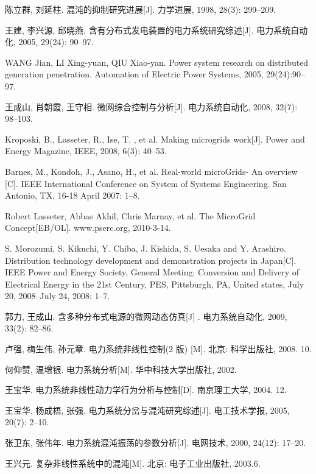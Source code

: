 \documentclass[withoutpreface,bwprint]{cumcmthesis} %
\begin{document}
\begin{thebibliography}{99}
   陈立群, 刘延柱. 混沌的抑制研究进展[J]. 力学进展, 1998, 28(3): 299--209.

   王建, 李兴源, 邱晓燕. 含有分布式发电装置的电力系统研究综述[J]. 电力系统自动化, 2005, 29(24): 90--97.

   WANG Jian, LI Xing-yuan, QIU Xiao-yan. Power system research on distributed generation penetration.
  Automation of Electric Power Systems, 2005, 29(24):90--97.

   王成山, 肖朝霞, 王守相. 微网综合控制与分析[J]. 电力系统自动化, 2008, 32(7): 98--103.

   Kroposki, B., Lasseter, R., Ise, T. , et al. Making microgrids work[J]. Power and Energy Magazine, IEEE,
  2008, 6(3): 40--53.

   Barnes, M., Kondoh, J., Asano, H., et al. Real-world microGrids- An overview [C]. IEEE International
  Conference on System of Systems Engineering. San Antonio, TX, 16-18 April 2007: 1--8.

   Robert Lasseter, Abbas Akhil, Chris Marnay, et al. The MicroGrid Concept[EB/OL]. www.pserc.org, 2010-3-14.

   S. Morozumi, S. Kikuchi, Y. Chiba, J. Kishida, S. Uesaka and Y. Arashiro. Distribution technology
  development and demonstration projects in Japan[C]. IEEE Power and Energy Society, General Meeting:
  Conversion and Delivery of Electrical Energy in the 21st Century, PES, Pittsburgh, PA, United states, July 20, 2008--July 24, 2008: 1--7.

   郭力, 王成山. 含多种分布式电源的微网动态仿真[J] . 电力系统自动化, 2009, 33(2): 82--86.

   卢强, 梅生伟, 孙元章. 电力系统非线性控制(2 版) [M]. 北京: 科学出版社, 2008. 10.

   何仰赞, 温增银. 电力系统分析[M]. 华中科技大学出版社, 2002.

   王宝华. 电力系统非线性动力学行为分析与控制[D]. 南京理工大学, 2004. 12.

   王宝华, 杨成梧, 张强. 电力系统分岔与混沌研究综述[J]. 电工技术学报, 2005, 20(7): 2--10.

   张卫东, 张伟年. 电力系统混沌振荡的参数分析[J]. 电网技术, 2000, 24(12): 17--20.

   王兴元. 复杂非线性系统中的混沌[M]. 北京: 电子工业出版社, 2003.6.

\end{thebibliography}
\end{document}
